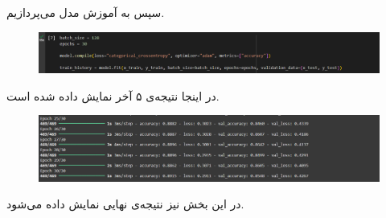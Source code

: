 \documentclass[12pt]{article}
\begin{document}
	\begin{figure}[H]
		\centering
		\quad \quad
	\end{figure}
	سپس به آموزش مدل می‌پردازیم.
	\begin{figure}[H]
		\centering
		\includegraphics[scale=0.5]{pic_9.png}
	\end{figure}
	در اینجا نتیجه‌ی ۵  آخر نمایش داده شده است.
	\begin{figure}[H]
		\centering
		\includegraphics[scale=0.45]{pic_10.png}
	\end{figure}
	در این بخش نیز نتیجه‌ی نهایی نمایش داده می‌شود.
\end{document}
